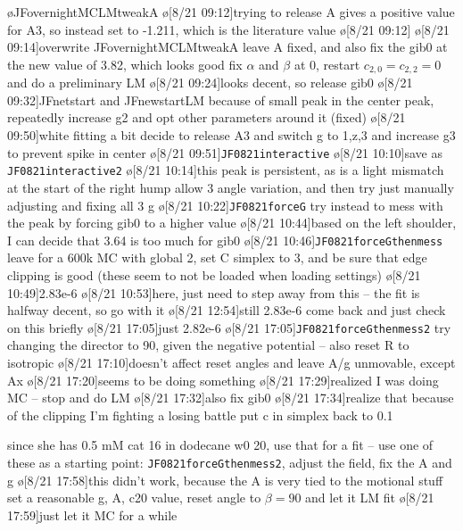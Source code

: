 \begin{err}
    \o{JFovernightMCLMtweakA}
    \o[8/21 09:12]{trying to release A gives a positive value for A3, so}
    instead set to -1.211, which is the literature value
    \o[8/21 09:12]{}
    \o[8/21 09:14]{overwrite JFovernightMCLMtweakA}
    leave A fixed, and also fix the gib0 at the new value of 3.82, which looks good
    fix $\alpha$ and $\beta$ at 0, restart $c_{2,0}=c_{2,2}=0$
    and do a preliminary LM
    \o[8/21 09:24]{looks decent, so} release gib0
    \o[8/21 09:32]{JFnetstart and JFnewstartLM}
    because of small peak in the center peak, repeatedly increase g2 and opt other parameters around it (fixed)
    \o[8/21 09:50]{white fitting a bit decide to}
    release A3 and switch g to 1,z,3 and increase g3 to prevent spike in center
    \o[8/21 09:51]{\texttt{JF0821interactive}}
    \o[8/21 10:10]{save as \texttt{JF0821interactive2}}
    \o[8/21 10:14]{this peak is persistent, as is a light mismatch at the start of the right hump}
    allow 3 angle variation, and then try just manually adjusting and fixing all 3 g
    \o[8/21 10:22]{\texttt{JF0821forceG}}
    try instead to mess with the peak by forcing gib0 to a higher value
    \o[8/21 10:44]{based on the left shoulder, I can decide that 3.64 is too much for gib0}
    \o[8/21 10:46]{\texttt{JF0821forceGthenmess}}
    leave for a 600k MC with global 2, set C simplex to 3, and be sure that edge clipping is good
    (these seem to not be loaded when loading settings)
    \o[8/21 10:49]{2.83e-6}
    \o[8/21 10:53]{here, just need to}
    step away from this -- the fit is halfway decent, so go with it
    \o[8/21 12:54]{still 2.83e-6}
    come back and just check on this briefly
    \o[8/21 17:05]{just 2.82e-6}
    \o[8/21 17:05]{\texttt{JF0821forceGthenmess2}}
    try changing the director to 90, given the negative potential -- also reset R to isotropic
    \o[8/21 17:10]{doesn't affect}
    reset angles and leave A/g unmovable, except Ax
    \o[8/21 17:20]{seems to be doing something}
    \o[8/21 17:29]{realized I was doing MC -- stop and do LM}
    \o[8/21 17:32]{also fix gib0}
    \o[8/21 17:34]{realize that because of the clipping I'm fighting a losing battle}
    put c in simplex back to 0.1
\end{err}
since she has 0.5 mM cat 16 in dodecane w0 20, use that for a fit -- use one of these as a starting point:
\texttt{JF0821forceGthenmess2},
adjust the field,
fix the A and g
\o[8/21 17:58]{this didn't work, because the A is very tied to the motional stuff}
set a reasonable g, A, c20 value, reset angle to $\beta=90$ and let it LM fit
\o[8/21 17:59]{just let it MC for a while}
